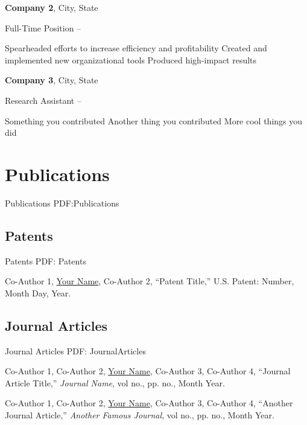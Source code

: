 \documentclass[letterpaper,9pt,oneside]{article}
\begin{document}
\begin{body}
\EntryGap
\textbf{Company 2}, City, State
\par
Full-Time Position
\hfill
{} --
\begin{detail}
\SmallEntryGap
\BulletItem
Spearheaded efforts to increase efficiency and profitability
\BulletItem
Created and implemented new organizational tools
\BulletItem
Produced high-impact results
\end{detail}

\EntryGap
\textbf{Company 3}, City, State
\par
Research Assistant
\hfill
{} --
\begin{detail}
\SmallEntryGap
\BulletItem
Something you contributed
\BulletItem
Another thing you contributed
\BulletItem
More cool things you did
\end{detail}



\section
{Publications}
{Publications}
{PDF:Publications}

\subsection
{Patents}
{Patents}
{PDF: Patents}

Co-Author 1, \underline{Your Name}, Co-Author 2,
``Patent Title,'' U.S. Patent: Number, Month Day, Year.

\EntryGap
\subsection
{Journal Articles}
{Journal Articles}
{PDF: JournalArticles}

Co-Author 1, Co-Author 2, \underline{Your Name}, Co-Author 3, Co-Author 4,
``Journal Article Title,''
\textit{Journal Name}, vol no., pp. no., Month Year.

\EntryGap
{}
Co-Author 1, Co-Author 2, \underline{Your Name}, Co-Author 3, Co-Author 4,
``Another Journal Article,''
\textit{Another Famous Journal}, vol no., pp. no., Month Year.





\end{body}
\end{document}
